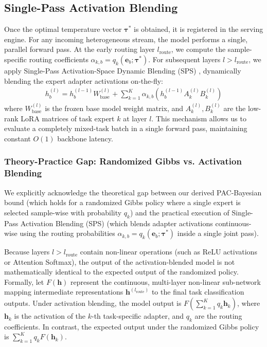 \subsection{Single-Pass Activation Blending}
Once the optimal temperature vector $\boldsymbol{\tau}^*$ is obtained, it is registered in the serving engine. For any incoming heterogeneous stream, the model performs a single, parallel forward pass. At the early routing layer $l_{\text{route}}$, we compute the sample-specific routing coefficients $\alpha_{k, b} = q_k(\mathbf{e}_b; \boldsymbol{\tau}^*)$. For subsequent layers $l > l_{\text{route}}$, we apply Single-Pass Activation-Space Dynamic Blending (SPS) \cite{chatterjee2024robustness}, dynamically blending the expert adapter activations on-the-fly:
\begin{align}
    h_b^{(l)} = h_b^{(l-1)} W_{\text{base}}^{(l)} + \sum_{k=1}^K \alpha_{k, b} \left( h_b^{(l-1)} A_k^{(l)} B_k^{(l)} \right)
\end{align}
where $W_{\text{base}}^{(l)}$ is the frozen base model weight matrix, and $A_k^{(l)}, B_k^{(l)}$ are the low-rank LoRA matrices of task expert $k$ at layer $l$. This mechanism allows us to evaluate a completely mixed-task batch in a single forward pass, maintaining constant $O(1)$ backbone latency.

\subsubsection{Theory-Practice Gap: Randomized Gibbs vs. Activation Blending}
We explicitly acknowledge the theoretical gap between our derived PAC-Bayesian bound (which holds for a randomized Gibbs policy where a single expert is selected sample-wise with probability $q_k$) and the practical execution of Single-Pass Activation Blending (SPS) (which blends adapter activations continuous-wise using the routing probabilities $\alpha_{k, b} = q_k(\mathbf{e}_b; \boldsymbol{\tau}^*)$ inside a single joint pass). 

Because layers $l > l_{\text{route}}$ contain non-linear operations (such as ReLU activations or Attention Softmax), the output of the activation-blended model is not mathematically identical to the expected output of the randomized policy. Formally, let $F(\mathbf{h})$ represent the continuous, multi-layer non-linear sub-network mapping intermediate representations $\mathbf{h}^{(l_{\text{route}})}$ to the final task classification outputs. Under activation blending, the model output is $F\left( \sum_{k=1}^K q_k \mathbf{h}_k \right)$, where $\mathbf{h}_k$ is the activation of the $k$-th task-specific adapter, and $q_k$ are the routing coefficients. In contrast, the expected output under the randomized Gibbs policy is $\sum_{k=1}^K q_k F(\mathbf{h}_k)$. 

